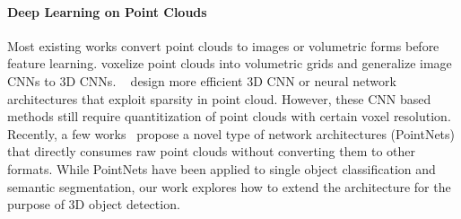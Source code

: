 \paragraph{Deep Learning on Point Clouds}
Most existing works convert point clouds to images or volumetric forms before feature learning. \cite{wu20153d, maturana2015voxnet, qi2016volumetric} voxelize point clouds into volumetric grids and generalize image CNNs to 3D CNNs. ~\cite{li2016fpnn, riegler2016octnet, wang2017cnn, engelcke2017vote3deep} design more efficient 3D CNN or neural network architectures that exploit sparsity in point cloud.
However, these CNN based methods still require quantitization of point clouds with certain voxel resolution.
Recently, a few works~\cite{qi2017pointnet,qi2017pointnetplusplus} propose a novel type of network architectures (PointNets) that directly consumes raw point clouds without converting them to other formats. While PointNets have been applied to single object classification and semantic segmentation, our work explores how to extend the architecture for the purpose of 3D object detection.